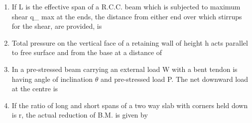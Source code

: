 \documentclass[11pt,a4paper]{article}
\begin{document}
\begin{enumerate}
\item{If L is the effective span of a R.C.C. beam which is subjected to maximum shear q\_ max at the ends, the distance from either end over which stirrups for the shear, are provided, is}
\\
\item{Total pressure on the vertical face of a retaining wall of height h acts parallel to free surface and from the base at a distance of}
\\
\item{In a pre-stressed beam carrying an external load W with a bent tendon is having angle of inclination $\theta$ and pre-stressed load P. The net downward load at the centre is}
\\
\item{If the ratio of long and short spans of a two way slab with corners held down is r, the actual reduction of B.M. is given by}
\\\begin{enumerate*}[itemjoin=\qquad, label=\Alph*.]

\end{enumerate*}
\end{enumerate}
\end{document}
